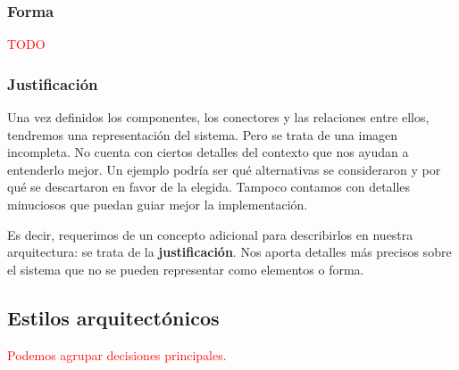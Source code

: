 \subsubsection{Forma}

\textcolor{red}{TODO}

\subsubsection{Justificación}

Una vez definidos los componentes, los conectores y las relaciones entre ellos, tendremos una representación del sistema. Pero se trata de una imagen incompleta. No cuenta con ciertos detalles del contexto que nos ayudan a entenderlo mejor. Un ejemplo podría ser qué alternativas se consideraron y por qué se descartaron en favor de la elegida. Tampoco contamos con detalles minuciosos que puedan guiar mejor la implementación.

Es decir, requerimos de un concepto adicional para describirlos en nuestra arquitectura: se trata de la \textbf{justificación}. \cite{perryFoundationsStudySoftware1992} Nos aporta detalles más precisos sobre el sistema que no se pueden representar como elementos o forma.

\subsection{Estilos arquitectónicos}

\textcolor{red}{Podemos agrupar decisiones principales.}
